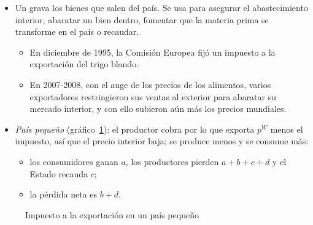 \documentclass[11pt]{article}
\begin{document}
\begin{itemize}
\item Un  grava los bienes que salen del país. Se usa para asegurar el abastecimiento interior, abaratar un bien dentro, fomentar que la materia prima se transforme en el país o recaudar.
  \begin{itemize}
  \item En diciembre de 1995, la Comisión Europea fijó un impuesto a la exportación del trigo blando\nocite{CE1995ImpuestoTrigo}.
  \item En 2007-2008, con el auge de los precios de los alimentos, varios exportadores restringieron sus ventas al exterior para abaratar su mercado interior, y con ello subieron aún más los precios mundiales\nocite{MartinAnderson2011Export}.
  \end{itemize}
\item \emph{País pequeño} (gráfico~\ref{fig:impuesto-exportacion}): el productor cobra por lo que exporta $p^W$ menos el impuesto, así que el precio interior baja; se produce menos y se consume más:
  \begin{itemize}
  \item los consumidores ganan $a$, los productores pierden $a+b+c+d$ y el Estado recauda $c$;
  \item la pérdida neta es $b+d$.
  \end{itemize}
\end{itemize}
\begin{figure}[H]
\centering
\caption{Impuesto a la exportación en un país pequeño}\label{fig:impuesto-exportacion}
\end{figure}
\end{document}
